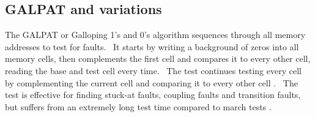 \subsection{GALPAT and variations}
The GALPAT or Galloping 1’s and 0’s algorithm sequences through all memory addresses to test for faults.  It starts by writing a background of zeros into all memory cells, then complements the first cell and compares it to every other cell, reading the base and test cell every time.  The test continues testing every cell by complementing the current cell and comparing it to every other cell \cite{oldref-09}.  The test is effective for finding stuck-at faults, coupling faults and transition faults, but suffers from an extremely long test time compared to march tests \cite{1327984}.  

